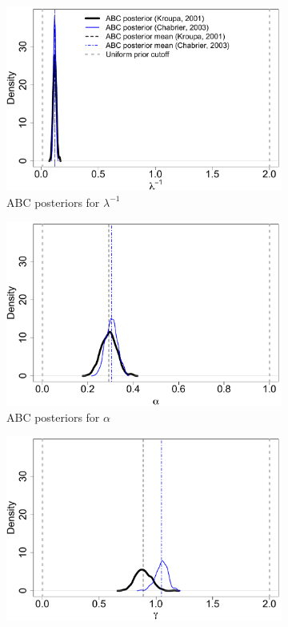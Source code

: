 \documentclass[12pt]{article}
\begin{document}
\begin{figure}[htbp]
\begin{subfigure}{0.32\textwidth}
\centering
\includegraphics[width = .95\textwidth]{figures/kc_k.pdf} 
\caption{ABC posteriors for $\lambda^{-1}$}\label{subfig:kc_k}
\end{subfigure}
\begin{subfigure}{0.32\textwidth}
\centering
\includegraphics[width = .95\textwidth]{figures/kc_alpha.pdf} 
\caption{ABC posteriors for $\alpha$}\label{subfig:kc_alpha}
\end{subfigure}
\begin{subfigure}{0.32\textwidth}
\centering
\includegraphics[width = .95\textwidth]{figures/kc_gamma.pdf} 

\end{subfigure}
\end{figure}
\end{document}

